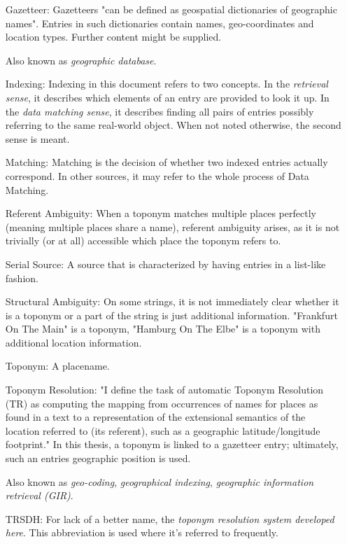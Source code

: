 \documentclass[11pt]{article}
\begin{document}
\begin{itemize}
\item [Gazetteer:] Gazetteers "can be defined as geospatial dictionaries of geographic names".\cite{hill00} Entries in such dictionaries contain names, geo-coordinates and location types. Further content might be supplied. \cite{hill00}

Also known as \emph{geographic database}.
\item [Indexing:] Indexing in this document refers to two concepts. In the \emph{retrieval sense}, it describes which elements of an entry are provided to look it up. In the \emph{data matching sense}, it describes finding all pairs of entries possibly referring to the same real-world object. When not noted otherwise, the second sense is meant.
\item [Matching:] Matching is the decision of whether two indexed entries actually correspond. In other sources, it may refer to the whole process of Data Matching.
\item [Referent Ambiguity:] When a toponym matches multiple places perfectly (meaning multiple places share a name), referent ambiguity arises, as it is not trivially (or at all) accessible which place the toponym refers to.
\item [Serial Source:] A source that is characterized by having entries in a list-like fashion.
\item [Structural Ambiguity:] On some strings, it is not immediately clear whether it is a toponym or a part of the string is just additional information. "Frankfurt On The Main" is a toponym, "Hamburg On The Elbe" is a toponym with additional location information.
\item [Toponym:] A placename. \cite[p. 25]{leidner07}
\item [Toponym Resolution:] "I define the task of automatic Toponym Resolution (TR) as computing the mapping from occurrences of names for places as found in a text to a representation of the extensional semantics of the location referred to (its referent), such as a geographic latitude/longitude footprint." \cite[p. 3]{leidner07} In this thesis, a toponym is linked to a gazetteer entry; ultimately, such an entries geographic position is used.

Also known as \emph{geo-coding}, \emph{geographical indexing}, \emph{geographic information retrieval (GIR)}.
\item [TRSDH:] For lack of a better name, the \emph{toponym resolution system developed here}. This abbreviation is used where it's referred to frequently.
\end{itemize}
\end{document}
